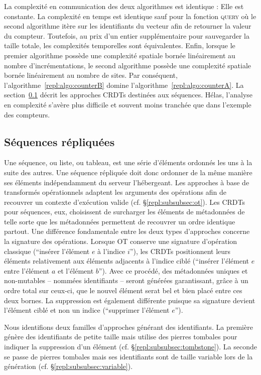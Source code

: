 La complexité en communication des deux algorithmes est identique : Elle est
constante. La complexité en temps est identique sauf pour la fonction
\textsc{query} où le second algorithme itère sur les identifiants du vecteur
afin de retourner la valeur du compteur. Toutefois, au prix d'un entier
supplémentaire pour sauvegarder la taille totale, les complexités temporelles
sont équivalentes. Enfin, lorsque le premier algorithme possède une complexité
spatiale bornée linéairement au nombre d'incrémentations, le second algorithme
possède une complexité spatiale bornée linéairement au nombre de sites. Par
conséquent, l'algorithme~\ref{repl:algo:counterB} domine
l'algorithme~\ref{repl:algo:counterA}. La section~\ref{repl:subsec:sequences}
décrit les approches CRDTs destinées aux séquences. Hélas, l'analyse en
complexité s'avère plus difficile et souvent moins tranchée que dans l'exemple
des compteurs.


\subsection{Séquences répliquées}
\label{repl:subsec:sequences}

Une séquence, ou liste, ou tableau, est une série d'éléments ordonnés les uns à
la suite des autres. Une séquence répliquée doit donc ordonner de la même
manière ses éléments indépendamment du serveur l'hébergeant. Les approches à
base de transformés opérationnels adaptent les arguments des opérations afin de
recouvrer un contexte d'exécution valide (cf. §\ref{repl:subsubsec:ot}). Les CRDTs
pour séquences, eux, choisissent de surcharger les éléments de métadonnées de
telle sorte que les métadonnées permettent de recouvrer un ordre identique
partout. Une différence fondamentale entre les deux types d'approches concerne
la signature des opérations. Lorsque OT conserve une signature d'opération
classique (``insérer l'élément $e$ à l'indice $i$''), les CRDTs positionnent
leurs éléments relativement aux éléments adjacents à l'indice ciblé (``insérer
l'élément $e$ entre l'élément $a$ et l'élément $b$''). Avec ce procédé, des
métadonnées uniques et non-mutables -- nommées identifiants -- seront générées
garantissant, grâce à un ordre total sur ceux-ci, que le nouvel élément serat
bel et bien placé entre ces deux bornes. La suppression est également différente
puisque sa signature devient l'élément ciblé et non un indice (``supprimer
l'élément $e$'').

Nous identifions deux familles d'approches générant des identifiants. La
première génère des identifiants de petite taille mais utilise des pierres
tombales pour indiquer la suppression d'un élément
(cf. §\ref{repl:subsubsec:tombstone}). La seconde se passe de pierres tombales mais
ses identifiants sont de taille variable lors de la génération
(cf. §\ref{repl:subsubsec:variable}).


